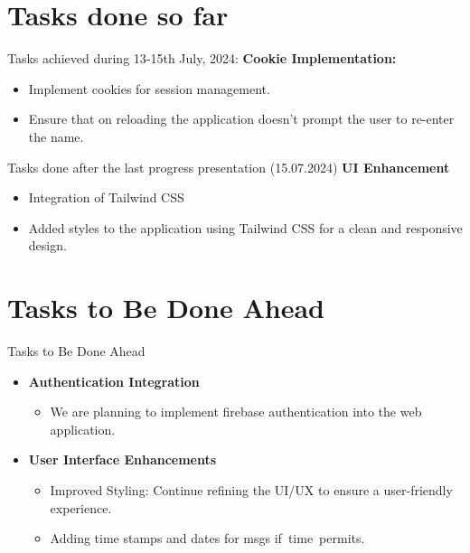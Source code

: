 \documentclass{beamer}
\begin{document}
\section{Tasks done so far}

\begin{frame}{Tasks achieved during 13-15th July, 2024:}
    \textbf{Cookie Implementation:}
        \begin{itemize}
            \item Implement cookies for session management.
            \item Ensure that on reloading the application doesn't prompt the user to re-enter the name.
        \end{itemize}
\end{frame}

\begin{frame}{Tasks done after the last progress presentation (15.07.2024)}
    \textbf{UI Enhancement}
        \begin{itemize}
            \item Integration of Tailwind CSS
            \item Added styles to the application using Tailwind CSS for a clean and responsive design.
         
        \end{itemize}
\end{frame}

\section{Tasks to Be Done Ahead}

\begin{frame}{Tasks to Be Done Ahead}
    \begin{itemize}
        \item \textbf{Authentication Integration}
        \begin{itemize}
            \item We are planning to implement firebase authentication into the web application.
        \end{itemize}
    \end{itemize}
    
    \begin{itemize}
        \item \textbf{User Interface Enhancements}
        \begin{itemize}
            \item Improved Styling: Continue refining the UI/UX to ensure a user-friendly experience.
            \item Adding time stamps and dates for msgs if time permits. 
        \end{itemize}
    \end{itemize}
\end{frame}
\end{document}
